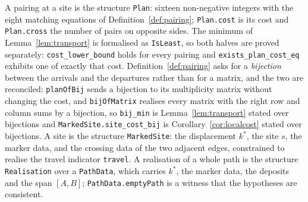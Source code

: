 \documentclass[11pt]{article}
\theoremstyle{plain}
\theoremstyle{definition}
\theoremstyle{remark}
\begin{document}
A pairing at a site is the structure \texttt{Plan}: sixteen non-negative integers with the eight
matching equations of Definition~\ref{def:pairing}; \texttt{Plan.cost} is its cost and
\texttt{Plan.cross} the number of pairs on opposite sides. The minimum of
Lemma~\ref{lem:transport} is formalised as \texttt{IsLeast}, so both halves are proved separately:
\texttt{cost\_lower\_bound} holds for every pairing and \texttt{exists\_plan\_cost\_eq} exhibits
one of exactly that cost. Definition~\ref{def:pairing} asks for a \emph{bijection} between the
arrivals and the departures rather than for a matrix, and the two are reconciled:
\texttt{planOfBij} sends a bijection to its multiplicity matrix without changing the cost, and
\texttt{bijOfMatrix} realises every matrix with the right row and column sums by a bijection, so
\texttt{bij\_min} is Lemma~\ref{lem:transport} stated over bijections and
\texttt{MarkedSite.site\_cost\_bij} is Corollary~\ref{cor:localcost} stated over bijections.
A site is the structure \texttt{MarkedSite}: the displacement $k^\ast$, the site $s$, the marker
data, and the crossing data of the two adjacent edges, constrained to realise the travel
indicator \texttt{travel}. A realisation of a whole path is the structure \texttt{Realisation}
over a \texttt{PathData}, which carries $k^\ast$, the marker data, the deposits and the span
$[A,B]$; \texttt{PathData.emptyPath} is a witness that the hypotheses are consistent.
\end{document}
